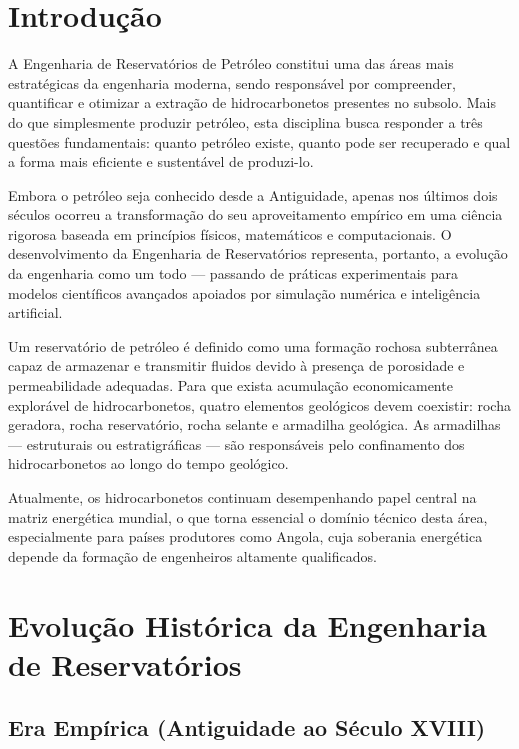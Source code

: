 \documentclass[12pt,a4paper,oneside,brazilian,sumario=tradicional]{abntex2}
\begin{document}
\tableofcontents*
\cleardoublepage
\textual

\chapter{Introdução}

A Engenharia de Reservatórios de Petróleo constitui uma das áreas mais estratégicas da engenharia moderna, sendo responsável por compreender, quantificar e otimizar a extração de hidrocarbonetos presentes no subsolo. Mais do que simplesmente produzir petróleo, esta disciplina busca responder a três questões fundamentais: quanto petróleo existe, quanto pode ser recuperado e qual a forma mais eficiente e sustentável de produzi-lo.

Embora o petróleo seja conhecido desde a Antiguidade, apenas nos últimos dois séculos ocorreu a transformação do seu aproveitamento empírico em uma ciência rigorosa baseada em princípios físicos, matemáticos e computacionais. O desenvolvimento da Engenharia de Reservatórios representa, portanto, a evolução da engenharia como um todo — passando de práticas experimentais para modelos científicos avançados apoiados por simulação numérica e inteligência artificial.

Um reservatório de petróleo é definido como uma formação rochosa subterrânea capaz de armazenar e transmitir fluidos devido à presença de porosidade e permeabilidade adequadas. Para que exista acumulação economicamente explorável de hidrocarbonetos, quatro elementos geológicos devem coexistir: rocha geradora, rocha reservatório, rocha selante e armadilha geológica. As armadilhas — estruturais ou estratigráficas — são responsáveis pelo confinamento dos hidrocarbonetos ao longo do tempo geológico.

Atualmente, os hidrocarbonetos continuam desempenhando papel central na matriz energética mundial, o que torna essencial o domínio técnico desta área, especialmente para países produtores como Angola, cuja soberania energética depende da formação de engenheiros altamente qualificados.

\chapter{Evolução Histórica da Engenharia de Reservatórios}

\section{Era Empírica (Antiguidade ao Século XVIII)}
\end{document}
